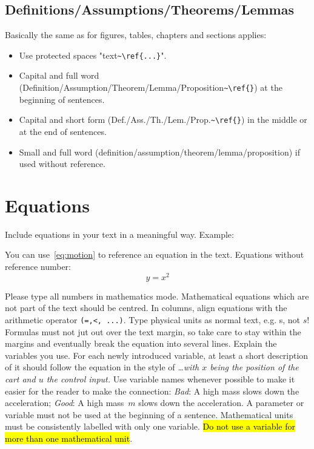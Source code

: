 \subsection{Definitions/Assumptions/Theorems/Lemmas}

Basically the same as for figures, tables, chapters and sections applies:
\begin{itemize}
	\item Use protected spaces "text\verb|~\ref{...}|".
	\item Capital and full word (Definition/Assumption/Theorem/Lemma/Proposition\verb|~\ref{}|) at the beginning of sentences.
	\item Capital and short form (Def./Ass./Th./Lem./Prop.\verb|~\ref{}|) in the middle or at the end of sentences.
	\item Small and full word (definition/assumption/theorem/lemma/proposition) if used without reference.
\end{itemize}

\section{Equations}
Include equations in your text in a meaningful way. Example:

\vspace{\baselineskip}

\vspace{\baselineskip}

You can use~\eqref{eq:motion} to reference an equation in the
text. Equations without reference number:
\[
y=x^2
\]



Please type all numbers in mathematics mode.
Mathematical equations which are not part of the text should be centred. In columns, align equations with the arithmetic operator \verb|(=,<, ...)|.
Type physical units as normal text, e.g. s, not $s$!
Formulas must not jut out over the text margin, so take care to stay within the margins and eventually break the equation into several lines.
Explain the variables you use. For each newly introduced variable, at least a short description of it should follow the equation in the style of \emph{\ldots with $x$ being the position of the cart and $u$ the control input.} Use variable names whenever possible to make it easier for the reader to make the connection: \emph{Bad}: A high mass slows down the acceleration; \emph{Good}: A high mass~$m$ slows down the acceleration.
A parameter or variable must not be used at the beginning of a sentence.
Mathematical units must be consistently labelled with only one variable. \hl{Do not
use a variable for more than one mathematical unit}.


